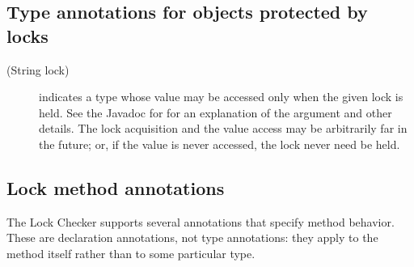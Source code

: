 \subsection{Type annotations for objects protected by locks\label{lock-annotations-objects}}

\begin{description}
\item[\small{(String lock)}]
  indicates a type whose value may be accessed only when the given lock is
  held.
  See the Javadoc for 
  for an explanation of the argument and other details.  The lock
  acquisition and the value access may be arbitrarily far in the future;
  or, if the value is never accessed, the lock never need be held.
\end{description}

\subsection{Lock method annotations\label{lock-annotations-methods}}

The Lock Checker supports several annotations that specify method behavior.
These are declaration annotations, not type annotations: they apply to the
method itself rather than to some particular type.

